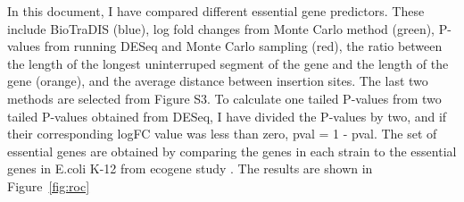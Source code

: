 \documentclass[12pt,letterpaper]{article}
\begin{document}
In this document, I have compared different essential gene predictors. These include BioTraDIS \cite{barquist_tradis_2016} (blue), log fold changes from Monte Carlo method \cite{turner_essential_2015} (green), P-values from running DESeq and Monte Carlo sampling (red), the ratio between the length of the longest uninterruped segment of the gene and the length of the gene (orange), and the average distance between insertion sites. The last two methods are selected from \cite{freed_combining_2016} Figure S3. To calculate one tailed P-values from two tailed P-values obtained from DESeq, I have divided the P-values by two, and if their corresponding logFC value was less than zero, pval = 1 - pval. The set of essential genes are obtained by comparing the genes in each strain to the essential genes in E.coli K-12 from ecogene study \cite{zhou_ecogene_2013}. The results are shown in Figure~\ref{fig:roc}
\end{document}
